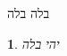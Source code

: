 \documentclass[english,hebrew]{amsart}
\theoremstyle{plain}
\newtheorem{thm}{\protect\theoremname}
\providecommand{\theoremname}{משפט}
\begin{document}
בלה בלה
\begin{thm}
יהי בלה
\end{thm}
\end{document}
